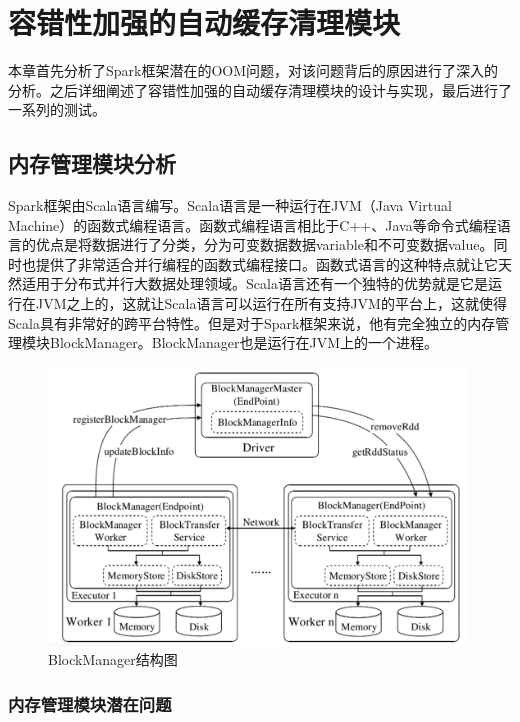 \chapter{容错性加强的自动缓存清理模块}\label{chap:clean}

本章首先分析了Spark框架潜在的OOM问题，对该问题背后的原因进行了深入的分析。之后详细阐述了容错性加强的自动缓存清理模块的设计与实现，最后进行了一系列的测试。

\section{内存管理模块分析}

Spark框架由Scala语言编写。Scala语言是一种运行在JVM（Java Virtual Machine）的函数式编程语言。函数式编程语言相比于C++、Java等命令式编程语言的优点是将数据进行了分类，分为可变数据数据variable和不可变数据value。同时也提供了非常适合并行编程的函数式编程接口。函数式语言的这种特点就让它天然适用于分布式并行大数据处理领域。Scala语言还有一个独特的优势就是它是运行在JVM之上的，这就让Scala语言可以运行在所有支持JVM的平台上，这就使得Scala具有非常好的跨平台特性。但是对于Spark框架来说，他有完全独立的内存管理模块BlockManager。BlockManager也是运行在JVM上的一个进程。

\begin{figure}
    \centering
    \includegraphics[width=0.99\textwidth]{Img/block-manager.jpg}
    \caption{BlockManager结构图}
    \label{fig:block-manager}
\end{figure}

\subsection{内存管理模块潜在问题}

